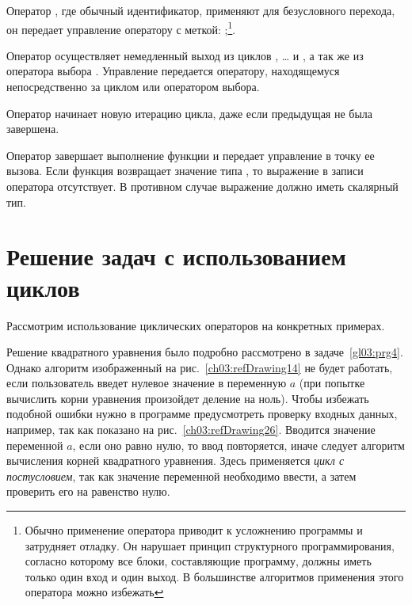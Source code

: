 Оператор  , где  обычный идентификатор, применяют
для безусловного перехода, он передает управление оператору с меткой: 
;\footnote{Обычно применение оператора  приводит к усложнению
программы и затрудняет отладку. Он нарушает принцип структурного программирования, согласно которому все блоки,
составляющие программу, должны иметь только один вход и один выход. В большинстве алгоритмов применения этого оператора
можно избежать}.

Оператор  осуществляет немедленный выход из циклов ,
… и , а так же из оператора выбора
. Управление передается оператору, находящемуся непосредственно за циклом или оператором
выбора. 

Оператор  начинает новую итерацию цикла, даже если предыдущая не была завершена. 

Оператор   завершает выполнение функции и передает управление в
точку ее вызова. Если функция возвращает значение типа , то выражение в записи оператора
отсутствует. В противном случае выражение должно иметь скалярный тип.

\section[Решение задач с использованием циклов]{Решение задач с использованием циклов}
Рассмотрим использование циклических операторов на конкретных примерах.


Решение квадратного уравнения было подробно рассмотрено в задаче~\ref{gl03:prg4}. Однако алгоритм изображенный 
на рис.~\ref{ch03:refDrawing14} не будет работать, если пользователь введет нулевое значение в переменную $a$ (при
попытке вычислить корни уравнения произойдет деление на ноль). Чтобы избежать подобной ошибки нужно в программе
предусмотреть проверку входных данных, например, так как показано на рис.~\ref{ch03:refDrawing26}. 
Вводится значение переменной
$a$, если оно равно нулю, то ввод повторяется, иначе следует алгоритм вычисления корней квадратного
уравнения. Здесь применяется \emph{цикл с постусловием}, так как значение переменной необходимо ввести, а
затем проверить его на равенство нулю.

